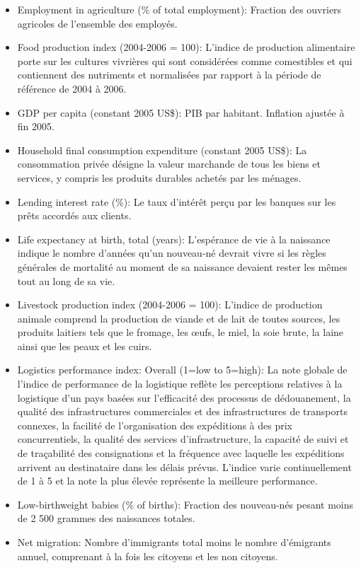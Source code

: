\begin{itemize}
	\item Employment in agriculture (\% of total employment): Fraction des ouvriers agricoles de l'ensemble des employés.
	\item Food production index (2004-2006 = 100): L'indice de production alimentaire porte sur les cultures vivrières qui sont considérées comme comestibles et qui contiennent des nutriments et normalisées par rapport à la période de référence de 2004 à 2006.
	\item GDP per capita (constant 2005 US\$): PIB par habitant. Inflation ajustée à fin 2005.
	\item Household final consumption expenditure (constant 2005 US\$):  La consommation privée désigne la valeur marchande de tous les biens et services, y compris les produits durables achetés par les ménages.
	\item Lending interest rate (\%): Le taux d'intérêt perçu par les banques sur les prêts accordés aux clients.	
	\item Life expectancy at birth, total (years): L'espérance de vie à la naissance indique le nombre d'années qu'un nouveau-né devrait vivre si les règles générales de mortalité au moment de sa naissance devaient rester les mêmes tout au long de sa vie.
	\item Livestock production index (2004-2006 = 100): L'indice de production animale comprend la production de viande et de lait de toutes sources, les produits laitiers tels que le fromage, les œufs, le miel, la soie brute, la laine ainsi que les peaux et les cuirs.
	\item Logistics performance index: Overall (1=low to 5=high): La note globale de l'indice de performance de la logistique reflète les perceptions relatives à la logistique d'un pays basées sur l'efficacité des processus de dédouanement, la qualité des infrastructures commerciales et des infrastructures de transports connexes, la facilité de l'organisation des expéditions à des prix concurrentiels, la qualité des services d'infrastructure, la capacité de suivi et de traçabilité des consignations et la fréquence avec laquelle les expéditions arrivent au destinataire dans les délais prévus. L'indice varie continuellement de 1 à 5 et la note la plus élevée représente la meilleure performance.
	\item Low-birthweight babies (\% of births): Fraction des nouveau-nés pesant moins de 2 500 grammes des naissances totales.
	\item Net migration: Nombre d'immigrants total moins le nombre d'émigrants annuel, comprenant à la fois les citoyens et les non citoyens.

\end{itemize}
